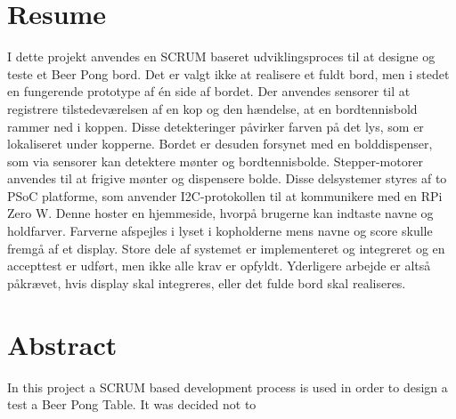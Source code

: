 \documentclass[Rapport/Rapport_main.tex]{subfiles}
\begin{document}
\section{Resume}
I dette projekt anvendes en SCRUM baseret udviklingsproces til at designe og teste et Beer Pong bord. Det er valgt ikke at realisere et fuldt bord, men i stedet en fungerende prototype af én side af bordet. Der anvendes sensorer til at registrere tilstedeværelsen af en kop og den hændelse, at en bordtennisbold rammer ned i koppen. Disse detekteringer påvirker farven på det lys, som er lokaliseret under kopperne. Bordet er desuden forsynet med en bolddispenser, som via sensorer kan detektere mønter og bordtennisbolde. Stepper-motorer anvendes til at frigive mønter og dispensere bolde. Disse delsystemer styres af to PSoC platforme, som anvender I2C-protokollen til at kommunikere med en RPi Zero W. Denne hoster en hjemmeside, hvorpå brugerne kan indtaste navne og holdfarver. Farverne afspejles i lyset i kopholderne mens navne og score skulle fremgå af et display. Store dele af systemet er implementeret og integreret og en accepttest er udført, men ikke alle krav er opfyldt. Yderligere arbejde er altså påkrævet, hvis display skal integreres, eller det fulde bord skal realiseres.

\section{Abstract}
In this project a SCRUM based development process is used in order to design a test a Beer Pong Table. It was decided not to 
\end{document}

